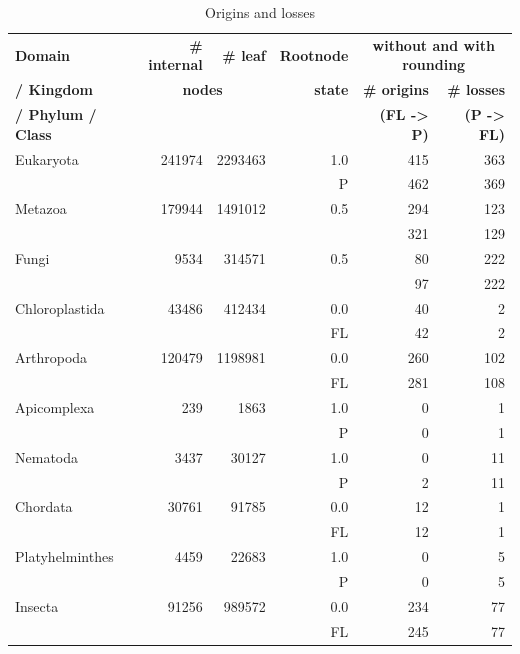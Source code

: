         \begin{table} [h]
          \begin{center}
            \begin{tabular}{ |l|r|r||r|r|r| }
              \hline
              \bfseries Domain  & \bfseries \# internal & \bfseries \# leaf & \bfseries Rootnode & \multicolumn{2}{c|}{\bfseries without and with rounding} \\ 
              \bfseries / Kingdom  & \multicolumn{2}{c||}{\bfseries nodes} & \bfseries state & \bfseries \# origins & \bfseries \# losses \\
              \bfseries / Phylum / Class & & & & \bfseries (FL -> P) & \bfseries (P -> FL) \\
              \hline \hline
              Eukaryota & 241974 & 2293463 & 1.0 & 415 & 363 \\
              & & & P & 462 & 369 \\
              \hline \hline
              Metazoa & 179944 & 1491012 & 0.5 & 294 & 123 \\
              & & & & 321 & 129 \\ \hline
              Fungi & 9534 & 314571 & 0.5 & 80 & 222 \\
              & & & & 97 & 222 \\ \hline
              Chloroplastida & 43486 & 412434 & 0.0 & 40 & 2 \\
              & & & FL & 42 & 2 \\
              \hline \hline            
              Arthropoda & 120479 & 1198981 & 0.0 & 260 & 102 \\
              & & & FL & 281 & 108 \\ \hline
              Apicomplexa & 239 & 1863 & 1.0 & 0 & 1 \\
              & & & P & 0 & 1 \\ \hline
              Nematoda & 3437 & 30127 & 1.0 & 0 & 11 \\
              & & & P & 2 & 11 \\ \hline
              Chordata & 30761 & 91785 & 0.0 & 12 & 1 \\
              & & & FL & 12 & 1 \\ \hline
              Platyhelminthes & 4459 & 22683 & 1.0 & 0 & 5 \\
              & & & P & 0 & 5 \\
              \hline \hline            
              Insecta & 91256 & 989572 & 0.0 & 234 & 77 \\
              & & & FL & 245 & 77 \\ 
              \hline  
            \end{tabular}
          \end{center}
          \caption{Origins and losses}
          \label{table:origins and losses} 
        \end{table}


